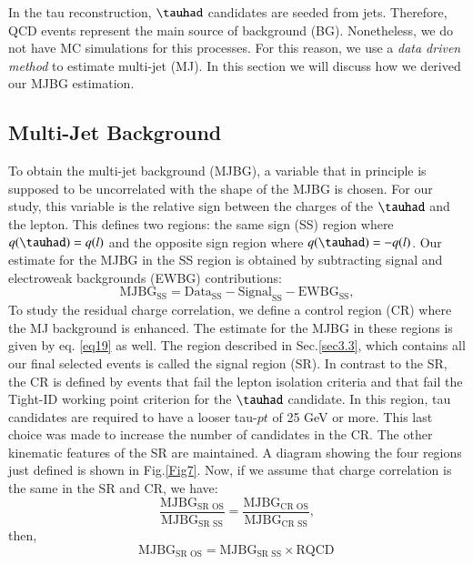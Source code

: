 In the tau reconstruction, $\tauhad$ candidates are seeded from jets. Therefore, QCD events represent the main source of background (BG). Nonetheless, we do not have MC simulations for this processes. For this reason, we use a \textit{data driven method} to estimate multi-jet (MJ). In this section we will discuss how we derived our MJBG estimation.

\subsection{Multi-Jet Background}
To obtain the multi-jet background (MJBG), a variable that in principle is supposed to be uncorrelated with the shape of the MJBG is chosen. For our study, this variable is the relative sign between the charges of the $\tauhad$ and the lepton. This defines two regions: the same sign (SS) region where $q(\tauhad)=q(l)$ and the opposite sign region where $q(\tauhad)=-q(l)$. Our estimate for the MJBG in the SS region is obtained by subtracting signal and electroweak backgrounds (EWBG) contributions:
\begin{equation}
\text{MJBG}_{\text{SS}}=\text{Data}_{\text{SS}}-\text{Signal}_{\text{SS}}-\text{EWBG}_{\text{SS}},
\label{eq19}
\end{equation}
To study the residual charge correlation, we define a control region (CR) where the MJ background is enhanced. The estimate for the MJBG in these regions is given by eq. \ref{eq19} as well. The region described in Sec.\ref{sec3.3}, which contains all our final selected events is called the signal region (SR). In contrast to the SR, the CR is defined by events that fail the lepton isolation criteria and that fail the Tight-ID working point criterion for the $\tauhad$ candidate. In this region, tau candidates are required to have a looser tau-$pt$ of 25 GeV or more. This last choice was made to increase the number of candidates in the CR. The other kinematic features of the SR are maintained. A diagram showing the four regions just defined is shown in Fig.\ref{Fig7}. Now, if we assume that charge correlation is the same in the SR and CR, we have:
 \begin{equation}
 \frac{\text{MJBG}_{\text{SR OS}}}{\text{MJBG}_{\text{SR SS}}}=\frac{\text{MJBG}_{\text{CR OS}}}{\text{MJBG}_{\text{CR SS}}},
 \end{equation}
then,
 \begin{equation}
\text{MJBG}_{\text{SR OS}}=\text{MJBG}_{\text{SR SS}}\times \text{RQCD}\,
\label{eq36}
\end{equation}
